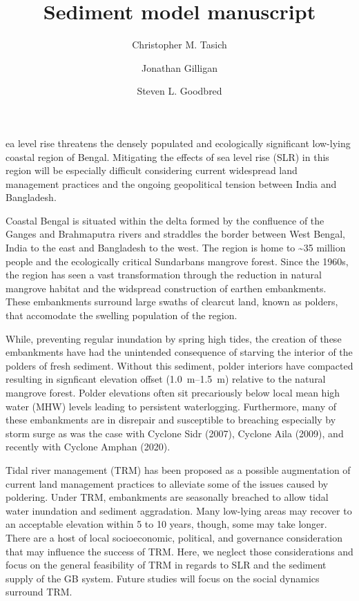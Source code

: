\documentclass[9pt,twocolumn,twoside,lineno]{pnas-new}
\title{Sediment model manuscript}
\author[a,1]{Christopher M. Tasich}
\author[a,2]{Jonathan Gilligan}
\author[a,3]{Steven L. Goodbred}
\affil[a]{Vanderbilt University}
\begin{document}
\maketitle
\thispagestyle{firststyle}

ea level rise threatens the densely populated and ecologically significant low-lying coastal region of Bengal. Mitigating the effects of sea level rise (SLR) in this region will be especially difficult considering current widespread land management practices and the ongoing geopolitical tension between India and Bangladesh.

Coastal Bengal is situated within the delta formed by the confluence of the Ganges and Brahmaputra rivers and straddles the border between West Bengal, India to the east and Bangladesh to the west. The region is home to \textasciitilde35 million people and the ecologically critical Sundarbans mangrove forest. Since the 1960s, the region has seen a vast transformation through the reduction in natural mangrove habitat and the widspread construction of earthen embankments. These embankments surround large swaths of clearcut land, known as polders, that accomodate the swelling population of the region.

While, preventing regular inundation by spring high tides, the creation of these embankments have had the unintended consequence of starving the interior of the polders of fresh sediment. Without this sediment, polder interiors have compacted resulting in signficant elevation offset (\SIrange{1.0}{1.5}{\meter}) relative to the natural mangrove forest\cite{auerbachFloodRiskNatural2015}. Polder elevations often sit precariously below local mean high water (MHW) levels leading to persistent waterlogging. Furthermore, many of these embankments are in disrepair and susceptible to breaching especially by storm surge as was the case with Cyclone Sidr (2007), Cyclone Aila (2009), and recently with Cyclone Amphan (2020).

Tidal river management (TRM) has been proposed as a possible augmentation of current land management practices to alleviate some of the issues caused by poldering. Under TRM, embankments are seasonally breached to allow tidal water inundation and sediment aggradation. Many low-lying areas may recover to an acceptable elevation within 5 to 10 years, though, some may take longer. There are a host of local socioeconomic, political, and governance consideration that may influence the success of TRM. Here, we neglect those considerations and focus on the general feasibility of TRM in regards to SLR and the sediment supply of the GB system. Future studies will focus on the social dynamics surround TRM.
\end{document}

